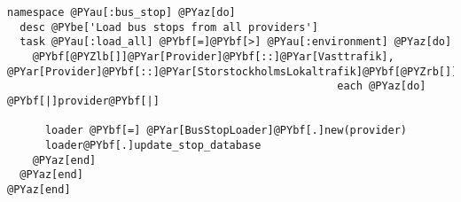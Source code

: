 \begin{Verbatim}[commandchars=@\[\]]
namespace @PYau[:bus_stop] @PYaz[do]
  desc @PYbe['Load bus stops from all providers']
  task @PYau[:load_all] @PYbf[=]@PYbf[>] @PYau[:environment] @PYaz[do]
    @PYbf[@PYZlb[]]@PYar[Provider]@PYbf[::]@PYar[Vasttrafik], @PYar[Provider]@PYbf[::]@PYar[StorstockholmsLokaltrafik]@PYbf[@PYZrb[]]@PYbf[.]
                                                    each @PYaz[do] @PYbf[|]provider@PYbf[|]
                                                      
      loader @PYbf[=] @PYar[BusStopLoader]@PYbf[.]new(provider)
      loader@PYbf[.]update_stop_database
    @PYaz[end]
  @PYaz[end]
@PYaz[end]
\end{Verbatim}

